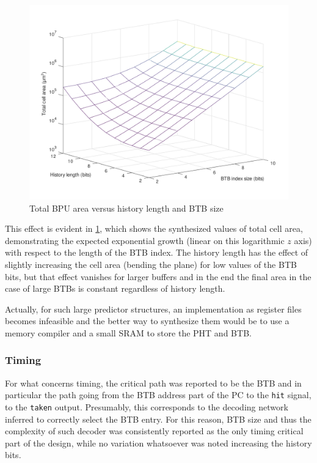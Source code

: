 \begin{figure}[hbt]
  \centering
  \includegraphics[width=\textwidth]{img/bpu_area.pdf}
  \caption{Total \acs{BPU} area versus history length and \ac{BTB} size}
  \label{fig:bpu_area}
\end{figure}
This effect is evident in \cref{fig:bpu_area}, which shows the synthesized values of total cell area, demonstrating the expected exponential growth (linear on this logarithmic $z$ axis) with respect to the length of the \ac{BTB} index. The history length has the effect of slightly increasing the cell area (bending the plane) for low values of the \ac{BTB} bits, but that effect vanishes for larger buffers and in the end the final area in the case of large \acp{BTB} is constant regardless of history length.

Actually, for such large predictor structures, an implementation as register files becomes infeasible and the better way to synthesize them would be to use a memory compiler and a small SRAM to store the \ac{PHT} and \ac{BTB}.

\subsubsection{Timing}
For what concerns timing, the critical path was reported to be the \ac{BTB} and in particular the path going from the \ac{BTB} address part of the \ac{PC} to the \texttt{hit} signal, to the \texttt{taken} output. Presumably, this corresponds to the decoding network inferred to correctly select the \ac{BTB} entry. For this reason, \ac{BTB} size and thus the complexity of such decoder was consistently reported as the only timing critical part of the design, while no variation whatsoever was noted increasing the history bits.

